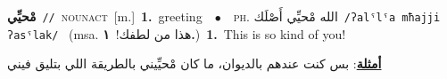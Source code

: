 \documentclass[10pt,a4paper,twoside]{article} %
\begin{document}
\begin{multicols}{2}
{\setlength\topsep{0pt}\textbf{\foreignlanguage{arabic}{مْحيِّي}}\ {\color{gray}\texttt{//}\color{black}}\ \textsc{noun\textunderscore act}\ [m.]\ \textbf{1.}~greeting\ \ $\bullet$\ \ \textsc{ph.} \color{gray} \foreignlanguage{arabic}{الله مْحيِّي أَصْلَك}\color{black}\ {\color{gray}\texttt{/{\sffamily ʔalˤlˤa mħajji ʔasˤlak}/}\color{black}}\ \color{gray} (msa. \foreignlanguage{arabic}{هذا من لطفك!}~\foreignlanguage{arabic}{\textbf{١.}})\color{black}\ \textbf{1.}~This is so kind of you!\  \begin{flushright}\color{gray}\foreignlanguage{arabic}{\textbf{\underline{\foreignlanguage{arabic}{أمثلة}}}: بس كنت عندهم بالديوان، ما كان مْحيِّيني بالطريقة اللي بتليق فيني}\end{flushright}\color{black}} \vspace{2mm}

\end{multicols}
\end{document}
